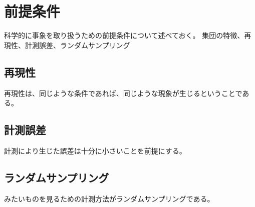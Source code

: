 \chapter{前提条件}
科学的に事象を取り扱うための前提条件について述べておく。
集団の特徴、再現性、計測誤差、ランダムサンプリング

\section{再現性}
再現性は、同じような条件であれば、同じような現象が生じるということである。

\section{計測誤差}
計測により生じた誤差は十分に小さいことを前提にする。

\section{ランダムサンプリング}
みたいものを見るための計測方法がランダムサンプリングである。

